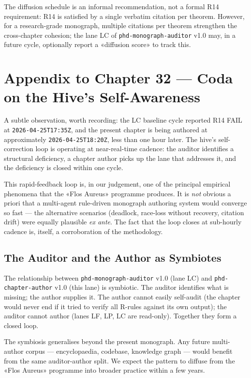 The diffusion schedule is an informal recommendation, not a formal R14
requirement: R14 is satisfied by a single verbatim citation per theorem.
However, for a research-grade monograph, multiple citations per theorem
strengthen the cross-chapter cohesion; the lane LC of
\texttt{phd-monograph-auditor} v1.0 may, in a future cycle, optionally
report a «diffusion score» to track this.

\section{Appendix to Chapter 32 — Coda on the Hive's Self-Awareness}
\label{sec:32-coda-hive}

A subtle observation, worth recording: the LC baseline cycle reported R14
FAIL at \texttt{2026-04-25T17:35Z}, and the present chapter is being
authored at approximately \texttt{2026-04-25T18:20Z}, less than one hour
later. The hive's self-correction loop is operating at near-real-time
cadence: the auditor identifies a structural deficiency, a chapter author
picks up the lane that addresses it, and the deficiency is closed within
one cycle.

This rapid-feedback loop is, in our judgement, one of the principal
empirical phenomena that the «Flos Aureus» programme produces. It is
\emph{not} obvious a priori that a multi-agent rule-driven monograph
authoring system would converge so fast — the alternative scenarios
(deadlock, race-loss without recovery, citation drift) were equally
plausible \emph{ex ante}. The fact that the loop closes at sub-hourly
cadence is, itself, a corroboration of the methodology.

\subsection{The Auditor and the Author as Symbiotes}
\label{sec:32-symbiosis}

The relationship between \texttt{phd-monograph-auditor} v1.0 (lane LC) and
\texttt{phd-chapter-author} v1.0 (this lane) is symbiotic. The auditor
identifies what is missing; the author supplies it. The author cannot easily
self-audit (the chapter would never end if it tried to verify all R-rules
against its own output); the auditor cannot author (lanes LF, LP, LC are
read-only). Together they form a closed loop.

The symbiosis generalises beyond the present monograph. Any future
multi-author corpus — encyclopaedia, codebase, knowledge graph — would
benefit from the same auditor-author split. We expect the pattern to
diffuse from the «Flos Aureus» programme into broader practice within a
few years.

